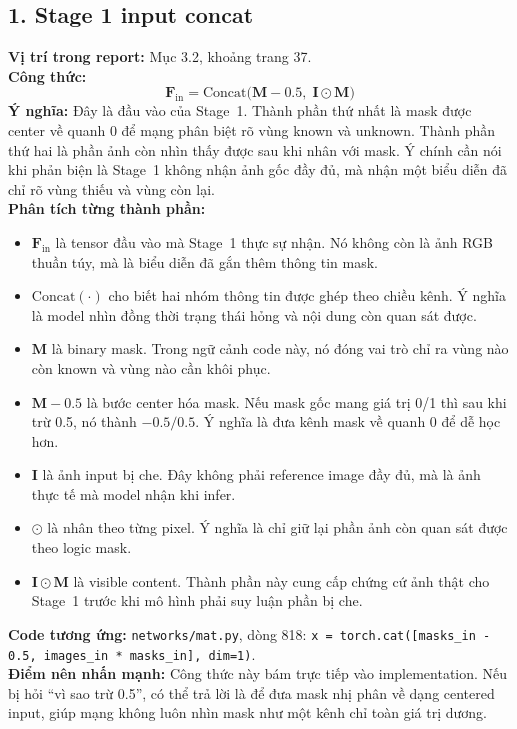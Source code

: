 \documentclass[12pt,a4paper]{article}
\begin{document}
\subsection*{1. Stage 1 input concat}
\textbf{Vị trí trong report:} Mục 3.2, khoảng trang 37.\\
\textbf{Công thức:}
\[
\mathbf{F}_{\mathrm{in}} = \mathrm{Concat}\big(\mathbf{M} - 0.5,\; \mathbf{I} \odot \mathbf{M}\big)
\]
\textbf{Ý nghĩa:} Đây là đầu vào của Stage~1. Thành phần thứ nhất là mask được center về quanh 0 để mạng phân biệt rõ vùng known và unknown. Thành phần thứ hai là phần ảnh còn nhìn thấy được sau khi nhân với mask. Ý chính cần nói khi phản biện là Stage~1 không nhận ảnh gốc đầy đủ, mà nhận một biểu diễn đã chỉ rõ vùng thiếu và vùng còn lại.\\
\textbf{Phân tích từng thành phần:}
\begin{itemize}[leftmargin=1.5em]
\item $\mathbf{F}_{\mathrm{in}}$ là tensor đầu vào mà Stage~1 thực sự nhận. Nó không còn là ảnh RGB thuần túy, mà là biểu diễn đã gắn thêm thông tin mask.
\item $\mathrm{Concat}(\cdot)$ cho biết hai nhóm thông tin được ghép theo chiều kênh. Ý nghĩa là model nhìn đồng thời trạng thái hỏng và nội dung còn quan sát được.
\item $\mathbf{M}$ là binary mask. Trong ngữ cảnh code này, nó đóng vai trò chỉ ra vùng nào còn known và vùng nào cần khôi phục.
\item $\mathbf{M}-0.5$ là bước center hóa mask. Nếu mask gốc mang giá trị 0/1 thì sau khi trừ 0.5, nó thành $-0.5/0.5$. Ý nghĩa là đưa kênh mask về quanh 0 để dễ học hơn.
\item $\mathbf{I}$ là ảnh input bị che. Đây không phải reference image đầy đủ, mà là ảnh thực tế mà model nhận khi infer.
\item $\odot$ là nhân theo từng pixel. Ý nghĩa là chỉ giữ lại phần ảnh còn quan sát được theo logic mask.
\item $\mathbf{I}\odot\mathbf{M}$ là visible content. Thành phần này cung cấp chứng cứ ảnh thật cho Stage~1 trước khi mô hình phải suy luận phần bị che.
\end{itemize}
\textbf{Code tương ứng:} \texttt{networks/mat.py}, dòng 818: \texttt{x = torch.cat([masks\_in - 0.5, images\_in * masks\_in], dim=1)}.\\
\textbf{Điểm nên nhấn mạnh:} Công thức này bám trực tiếp vào implementation. Nếu bị hỏi ``vì sao trừ 0.5'', có thể trả lời là để đưa mask nhị phân về dạng centered input, giúp mạng không luôn nhìn mask như một kênh chỉ toàn giá trị dương.
\end{document}

